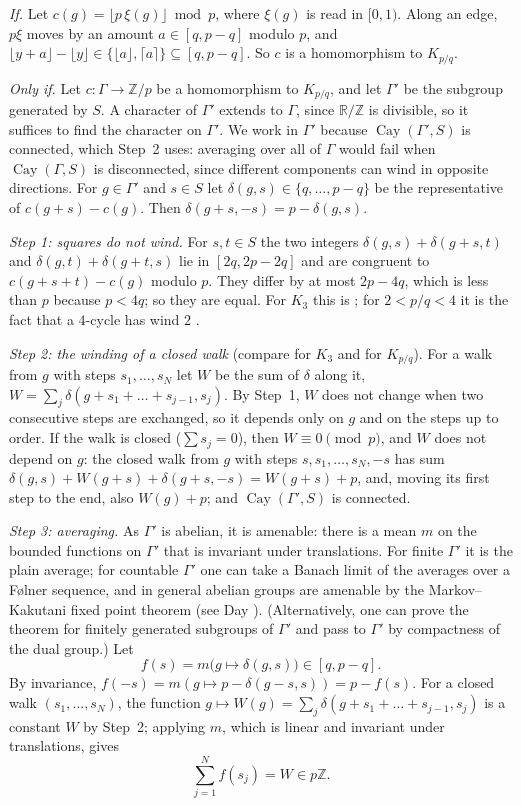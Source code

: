 \documentclass[11pt,a4paper]{amsart}
\theoremstyle{definition}
\newcommand{\R}{\mathbb{R}}
\newcommand{\Z}{\mathbb{Z}}
\newcommand{\Cay}{\operatorname{Cay}}
\newcommand{\RZ}{\R/\Z}
\begin{document}
\emph{If.} Let $c(g)=\lfloor p\,\xi(g)\rfloor\bmod p$, where $\xi(g)$ is read in $[0,1)$. Along an edge, $p\xi$
moves by an amount $a\in[q,p-q]$ modulo $p$, and $\lfloor y+a\rfloor-\lfloor y\rfloor\in\{\lfloor a\rfloor,\lceil
a\rceil\}\subseteq[q,p-q]$. So $c$ is a homomorphism to $K_{p/q}$.

\emph{Only if.} Let $c:\Gamma\to\Z/p$ be a homomorphism to $K_{p/q}$, and let $\Gamma'$ be the subgroup generated by
$S$. A character of $\Gamma'$ extends to $\Gamma$, since $\RZ$ is divisible, so it suffices to find the character
on $\Gamma'$. We work in $\Gamma'$ because $\Cay(\Gamma',S)$ is connected, which Step~2 uses: averaging over all
of $\Gamma$ would fail when $\Cay(\Gamma,S)$ is disconnected, since different components can wind in opposite
directions. For $g\in\Gamma'$ and $s\in S$ let $\delta(g,s)\in\{q,\dots,p-q\}$ be the representative of
$c(g+s)-c(g)$. Then $\delta(g+s,-s)=p-\delta(g,s)$.

\smallskip
\emph{Step 1: squares do not wind.} For $s,t\in S$ the two integers $\delta(g,s)+\delta(g+s,t)$ and
$\delta(g,t)+\delta(g+t,s)$ lie in $[2q,2p-2q]$ and are congruent to $c(g+s+t)-c(g)$ modulo $p$. They differ by at
most $2p-4q$, which is less than $p$ because $p<4q$; so they are equal. For $K_3$ this is
\cite[Proposition~3.6]{KS}; for $2<p/q<4$ it is the fact that a $4$-cycle has wind $2$ \cite[\S2]{BM}.

\smallskip
\emph{Step 2: the winding of a closed walk} (compare \cite[Definition~3.5, Propositions~3.3 and~3.6]{KS} for $K_3$
and \cite[\S2]{BM} for $K_{p/q}$). For a
walk from $g$ with steps $s_1,\dots,s_N$ let $W$ be the sum of $\delta$ along it,
$W=\sum_j\delta(g+s_1+\dots+s_{j-1},s_j)$. By Step~1, $W$ does not change when two consecutive steps are exchanged,
so it depends only on $g$ and on the steps up to order. If the walk is closed ($\sum s_j=0$), then $W\equiv0\pmod p$,
and $W$ does not depend on $g$: the closed walk from $g$ with steps $s,s_1,\dots,s_N,-s$ has sum
$\delta(g,s)+W(g+s)+\delta(g+s,-s)=W(g+s)+p$, and, moving its first step to the end, also $W(g)+p$; and
$\Cay(\Gamma',S)$ is connected.

\smallskip
\emph{Step 3: averaging.} As $\Gamma'$ is abelian, it is amenable: there is a mean $m$ on the bounded functions on
$\Gamma'$ that is invariant under translations. For finite $\Gamma'$ it is the plain average; for countable
$\Gamma'$ one can take a Banach limit of the averages over a F\o lner sequence, and in general abelian groups are
amenable by the Markov--Kakutani fixed point theorem (see Day \cite{Day}). (Alternatively, one can prove the
theorem for finitely generated subgroups of $\Gamma'$ and pass to $\Gamma'$ by compactness of the dual group.) Let
\[
f(s)=m\bigl(g\mapsto\delta(g,s)\bigr)\in[q,p-q].
\]
By invariance, $f(-s)=m(g\mapsto p-\delta(g-s,s))=p-f(s)$. For a closed walk $(s_1,\dots,s_N)$, the function
$g\mapsto W(g)=\sum_j\delta(g+s_1+\dots+s_{j-1},s_j)$ is a constant $W$ by Step~2; applying $m$, which is linear
and invariant under translations, gives
\[
\sum_{j=1}^Nf(s_j)=W\in p\Z.
\]
\end{document}
